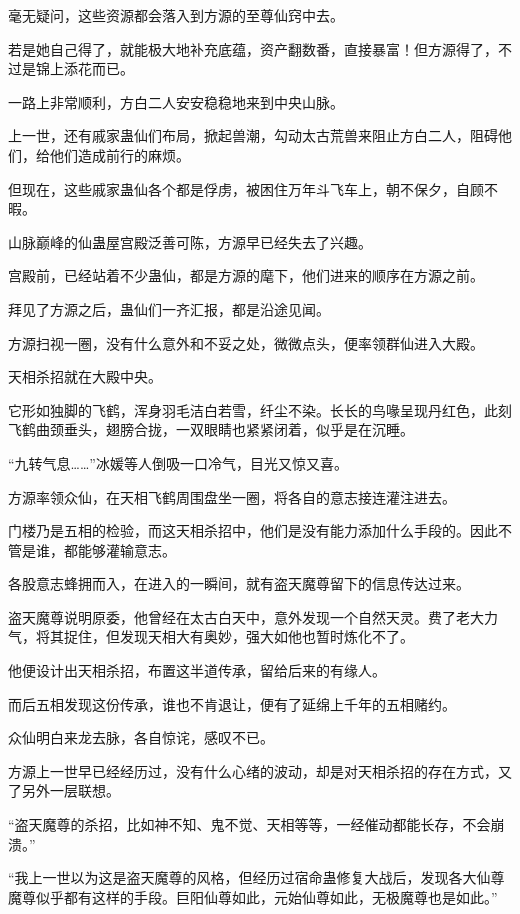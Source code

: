 \begin{this_body}
毫无疑问，这些资源都会落入到方源的至尊仙窍中去。

若是她自己得了，就能极大地补充底蕴，资产翻数番，直接暴富！但方源得了，不过是锦上添花而已。

一路上非常顺利，方白二人安安稳稳地来到中央山脉。

上一世，还有戚家蛊仙们布局，掀起兽潮，勾动太古荒兽来阻止方白二人，阻碍他们，给他们造成前行的麻烦。

但现在，这些戚家蛊仙各个都是俘虏，被困住万年斗飞车上，朝不保夕，自顾不暇。

山脉巅峰的仙蛊屋宫殿泛善可陈，方源早已经失去了兴趣。

宫殿前，已经站着不少蛊仙，都是方源的麾下，他们进来的顺序在方源之前。

拜见了方源之后，蛊仙们一齐汇报，都是沿途见闻。

方源扫视一圈，没有什么意外和不妥之处，微微点头，便率领群仙进入大殿。

天相杀招就在大殿中央。

它形如独脚的飞鹤，浑身羽毛洁白若雪，纤尘不染。长长的鸟喙呈现丹红色，此刻飞鹤曲颈垂头，翅膀合拢，一双眼睛也紧紧闭着，似乎是在沉睡。

“九转气息……”冰媛等人倒吸一口冷气，目光又惊又喜。

方源率领众仙，在天相飞鹤周围盘坐一圈，将各自的意志接连灌注进去。

门楼乃是五相的检验，而这天相杀招中，他们是没有能力添加什么手段的。因此不管是谁，都能够灌输意志。

各股意志蜂拥而入，在进入的一瞬间，就有盗天魔尊留下的信息传达过来。

盗天魔尊说明原委，他曾经在太古白天中，意外发现一个自然天灵。费了老大力气，将其捉住，但发现天相大有奥妙，强大如他也暂时炼化不了。

他便设计出天相杀招，布置这半道传承，留给后来的有缘人。

而后五相发现这份传承，谁也不肯退让，便有了延绵上千年的五相赌约。

众仙明白来龙去脉，各自惊诧，感叹不已。

方源上一世早已经经历过，没有什么心绪的波动，却是对天相杀招的存在方式，又了另外一层联想。

“盗天魔尊的杀招，比如神不知、鬼不觉、天相等等，一经催动都能长存，不会崩溃。”

“我上一世以为这是盗天魔尊的风格，但经历过宿命蛊修复大战后，发现各大仙尊魔尊似乎都有这样的手段。巨阳仙尊如此，元始仙尊如此，无极魔尊也是如此。”


\end{this_body}
